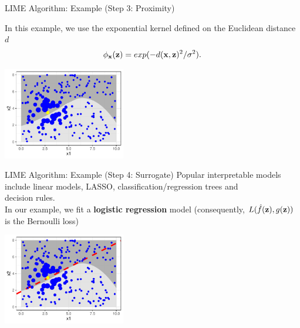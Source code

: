 \documentclass[11pt,compress,t,notes=noshow, aspectratio=169, xcolor=table]{beamer}
\begin{document}
\begin{frame}{LIME Algorithm: Example (Step 3: Proximity) }

	In this example, we use the exponential kernel defined on the Euclidean distance $d$
		 $$\neigh(\zv) = exp(-d(\xv, \zv)^2/\sigma^2).$$ 
		\begin{center}
			\includegraphics[width=0.4\textwidth]{figure/lime4}
		\end{center}
		
		
\end{frame}
		
\begin{frame}[c]{LIME Algorithm: Example (Step 4: Surrogate) }
		Popular interpretable models include linear models, LASSO, classification/regression trees and\\ decision rules.\\
		In our example, we fit a \textbf{logistic regression} model (consequently, $L(\fh(\zv), g(\zv))$ is the Bernoulli loss)
		\begin{center}
			\includegraphics[width=0.4\textwidth]{figure/lime5}
		\end{center}
\end{frame}
\end{document}
